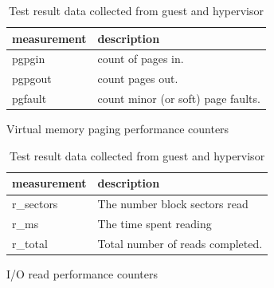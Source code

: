 \begin{table}[h]
\begin{subtable}[h]{0.45\textwidth}
\begin{tabular}{ l p{5cm} }
       measurement & description \\
       \hline
       pgpgin  &  count of pages in. \\
       pgpgout  & count pages out. \\
       pgfault  & count minor (or soft) page faults. \\
       \hline
\end{tabular}
\caption{Virtual memory paging performance counters \cite{memory}}
\label{fig:memory}
\end{subtable}
\hfill
\begin{subtable}[h]{0.45\textwidth}
\begin{tabular}{ l p{5cm} }
       measurement & description \\
       \hline
       r\_sectors & The number block sectors read \\
       r\_ms & The time spent reading \\
       r\_total & Total number of reads completed. \\
       \hline
\end{tabular}
\caption{I/O read performance counters \cite{iostats}}
\label{fig:io}
\end{subtable}
\caption{Test result data collected from guest and hypervisor}
\end{table}

